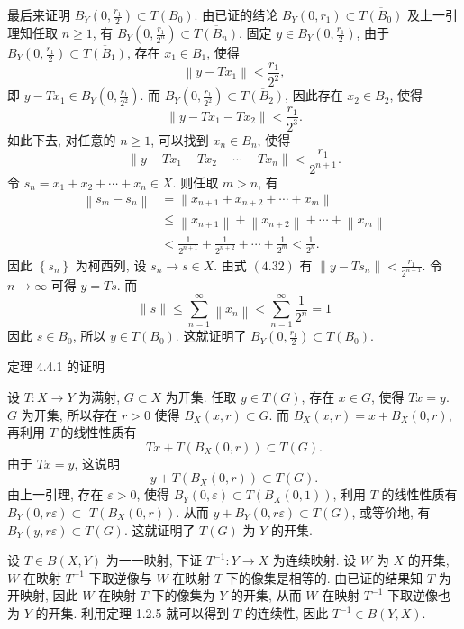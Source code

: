\documentclass[openany]{ctexbook}
\makeatletter
\theoremstyle{kaiti}
\theoremstyle{normal}
\renewenvironment{proof}[1][\proofname]{\par
    \pushQED{\qed}%
    \normalfont \topsep6\p@\@plus6\p@\relax
    \trivlist
    \item\relax
    {\heiti #1}\hspace{2\labelsep}\ignorespaces
  }{%
    \popQED\endtrivlist\@endpefalse
  }
\makeatother
\begin{document}
\begin{proof}
最后来证明 $B_{Y}\left(0, \frac{r_1}{2}\right) \subset T\left(B_0\right)$. 由已证的结论 $B_{Y}\left(0, r_1\right) \subset \overline{T\left(B_0\right)}$ 及上一引理知任取 $n \geqslant 1$, 有 $B_{Y}\left(0, \frac{r_1}{2^n}\right) \subset \overline{T\left(B_n\right)}$. 固定 $y \in B_{Y}\left(0, \frac{r_1}{2}\right)$, 由于 $B_{Y}\left(0, \frac{r_1}{2}\right) \subset \overline{T\left(B_1\right)}$, 存在 $x_1 \in B_1$, 使得
$$
\left\|y-T x_1\right\|<\frac{r_1}{2^2},
$$
即 $y-T x_1 \in B_{Y}\left(0, \frac{r_1}{2^2}\right)$. 而 $B_{Y}\left(0, \frac{r_1}{2^2}\right) \subset \overline{T\left(B_2\right)}$, 因此存在 $x_2 \in B_2$, 使得
$$
\left\|y-T x_1-T x_2\right\|<\frac{r_1}{2^3}.
$$
如此下去, 对任意的 $n \geqslant 1$, 可以找到 $x_n \in B_n$, 使得
\begin{equation}
  \left\|y-T x_1-T x_2-\cdots-T x_n\right\|<\frac{r_1}{2^{n+1}}.
\end{equation}
令 $s_n=x_1+x_2+\cdots+x_n \in X$. 则任取 $m>n$, 有
$$
\begin{aligned}
\left\|s_m-s_n\right\| &=\left\|x_{n+1}+x_{n+2}+\cdots+x_m\right\| \\
& \leqslant\left\|x_{n+1}\right\|+\left\|x_{n+2}\right\|+\cdots+\left\|x_m\right\| \\
&<\frac{1}{2^{n+1}}+\frac{1}{2^{n+2}}+\cdots+\frac{1}{2^m}<\frac{1}{2^n}.
\end{aligned}
$$
因此 $\left\{s_n\right\}$ 为柯西列, 设 $s_n \rightarrow s \in X$. 由式 $(4.32)$ 有 $\left\|y-T s_n\right\|<\frac{r_1}{2^{n+1}}$. 令 $n \rightarrow \infty$ 可得 $y=T s$. 而
$$
\|s\| \leqslant \sum_{n=1}^{\infty}\left\|x_n\right\|<\sum_{n=1}^{\infty} \frac{1}{2^n}=1
$$
因此 $s \in B_0$, 所以 $y \in T\left(B_0\right)$. 这就证明了 $B_{Y}\left(0, \frac{r_1}{2}\right) \subset T\left(B_0\right)$.
\end{proof}

\begin{proof}[定理 4.4.1 的证明]
设 $T: X \rightarrow Y$ 为满射, $G \subset X$ 为开集. 任取 $y \in T(G)$, 存在 $x \in G$, 使得 $T x=y$. $G$ 为开集, 所以存在 $r>0$ 使得 $B_{X}(x, r) \subset G$. 而 $B_{X}(x, r)=x+B_{X}(0, r)$, 再利用 $T$ 的线性性质有
$$
T x+T\left(B_{X}(0, r)\right) \subset T(G).
$$
由于 $T x=y$, 这说明
$$
y+T\left(B_{X}(0, r)\right) \subset T(G).
$$
由上一引理, 存在 $\varepsilon>0$, 使得 $B_{Y}(0, \varepsilon) \subset T\left(B_{X}(0,1)\right)$, 利用 $T$ 的线性性质有 $B_{Y}(0, r \varepsilon) \subset$ $T\left(B_{X}(0, r)\right)$. 从而 $y+B_{Y}(0, r \varepsilon) \subset T(G)$, 或等价地, 有 $B_{Y}(y, r \varepsilon) \subset T(G)$. 这就证明了 $T(G)$ 为 $Y$ 的开集.

设 $T \in B(X, Y)$ 为一一映射, 下证 $T^{-1}: Y \rightarrow X$ 为连续映射. 设 $W$ 为 $X$ 的开集, $W$ 在映射 $T^{-1}$ 下取逆像与 $W$ 在映射 $T$ 下的像集是相等的. 由已证的结果知 $T$ 为开映射, 因此 $W$ 在映射 $T$ 下的像集为 $Y$ 的开集, 从而 $W$ 在映射 $T^{-1}$ 下取逆像也为 $Y$ 的开集. 利用定理 1.2.5 就可以得到 $T$ 的连续性, 因此 $T^{-1} \in B(Y, X)$.
\end{proof}
\end{document}
